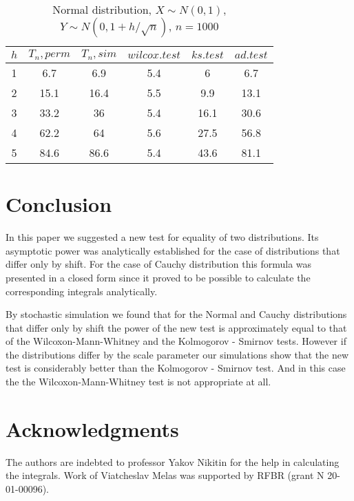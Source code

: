 \documentclass{svproc}
\begin{document}
\begin{table}
  \caption{Normal distribution, $X\sim N(0,1)$, $Y\sim N(0, 1 + h/\sqrt{n})$, $n=1000$}
  \begin{center}
  \begin{tabular}{c@{\quad}c@{\quad}c@{\quad}c@{\quad}c@{\quad}c}
  \hline
  $h$ & $T_n, perm$ & $T_n, sim$ & $wilcox.test$ & $ks.test$ & $ad.test$ \\
  \hline
  1 & 6.7 & 6.9 & 5.4 & 6 & 6.7 \\
  2 & 15.1 & 16.4 & 5.5 & 9.9 & 13.1 \\
  3 & 33.2 & 36 & 5.4 & 16.1 & 30.6 \\
  4 & 62.2 & 64 & 5.6 & 27.5 & 56.8 \\
  5 & 84.6 & 86.6 & 5.4 & 43.6 & 81.1 \\
  \hline
  \end{tabular}
  \end{center}
\end{table}





\section{Conclusion}
In this paper we suggested a new test for equality of two distributions. Its asymptotic power was analytically established for the case of distributions that differ only by shift. For the case of Cauchy distribution this formula was presented in a closed form  since it proved to be possible to calculate the corresponding integrals analytically.

By stochastic simulation we found that for the Normal and Cauchy distributions that differ only by shift the power of the new test is approximately equal to that of the Wilcoxon-Mann-Whitney and the
Kolmogorov - Smirnov tests. However if the distributions differ by the scale parameter our simulations show that the new test is considerably better than the Kolmogorov - Smirnov test. And in this case the the Wilcoxon-Mann-Whitney test is not appropriate at all.

\section*{Acknowledgments}
The authors are indebted to professor Yakov Nikitin for the help in calculating the  integrals. Work of Viatcheslav Melas was supported by RFBR (grant N 20-01-00096).
\end{document}
